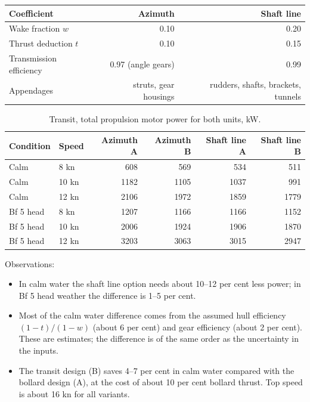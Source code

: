 \documentclass[a4paper,11pt]{article}
\begin{document}
\begin{center}
\begin{tabular}{lrr}
\toprule
Coefficient & Azimuth & Shaft line\\[0pt]
\midrule
Wake fraction \(w\) & 0.10 & 0.20\\[0pt]
Thrust deduction \(t\) & 0.10 & 0.15\\[0pt]
Transmission efficiency & 0.97 (angle gears) & 0.99\\[0pt]
Appendages & struts, gear housings & rudders, shafts, brackets, tunnels\\[0pt]
\bottomrule
\end{tabular}
\end{center}

\begin{table}[H]
\caption{Transit, total propulsion motor power for both units, kW.}
\centering
\begin{tabular}{llrrrr}
\toprule
Condition & Speed & Azimuth A & Azimuth B & Shaft line A & Shaft line B\\[0pt]
\midrule
Calm & 8 kn & 608 & 569 & 534 & 511\\[0pt]
Calm & 10 kn & 1182 & 1105 & 1037 & 991\\[0pt]
Calm & 12 kn & 2106 & 1972 & 1859 & 1779\\[0pt]
Bf 5 head & 8 kn & 1207 & 1166 & 1166 & 1152\\[0pt]
Bf 5 head & 10 kn & 2006 & 1924 & 1906 & 1870\\[0pt]
Bf 5 head & 12 kn & 3203 & 3063 & 3015 & 2947\\[0pt]
\bottomrule
\end{tabular}
\end{table}

Observations:
\begin{itemize}
\item In calm water the shaft line option needs about 10--12 per cent less power; in
Bf 5 head weather the difference is 1--5 per cent.
\item Most of the calm water difference comes from the assumed hull efficiency
\((1-t)/(1-w)\) (about 6 per cent) and gear efficiency (about 2 per cent).  These are
estimates; the difference is of the same order as the uncertainty in the inputs.
\item The transit design (B) saves 4--7 per cent in calm water compared with the bollard
design (A), at the cost of about 10 per cent bollard thrust.  Top speed is about
16 kn for all variants.
\end{itemize}
\end{document}
